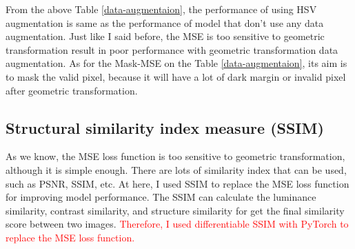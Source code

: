 From the above Table \ref{data-augmentaion}, the performance of using HSV augmentation is same as the performance of model that don't use any data augmentation. Just like I said before, the MSE is too sensitive to geometric transformation result in poor performance with geometric transformation data augmentation. As for the Mask-MSE on the Table \ref{data-augmentaion}, its aim is to mask the valid pixel, because it will have a lot of dark margin or invalid pixel after geometric transformation.

\subsection{Structural similarity index measure (SSIM)}
As we know, the MSE loss function is too sensitive to geometric transformation, although it is simple enough. There are lots of similarity index that can be used, such as PSNR, SSIM, etc. At here, I used SSIM to replace the MSE loss function for improving model performance. The SSIM can calculate the luminance similarity, contrast similarity, and structure similarity for get the final similarity score between two images. \textcolor{red}{Therefore, I used differentiable SSIM with PyTorch to replace the MSE loss function.}


